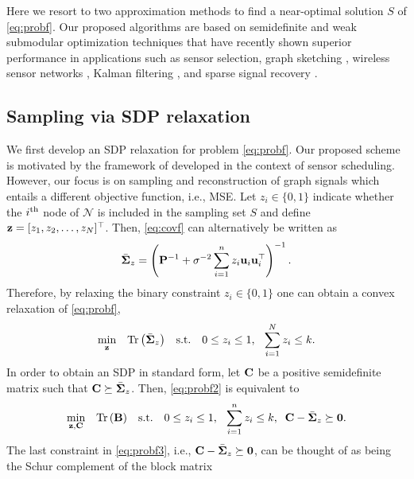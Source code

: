 Here we resort to two approximation methods to find a near-optimal solution $S$ of \ref{eq:probf}. Our proposed algorithms are based on semidefinite and weak submodular optimization techniques that have recently shown superior performance in applications such as sensor selection\cite{joshi2009sensor}, graph sketching \cite{gama2016rethinking}, wireless sensor networks \cite{shamaiah2012greedy}, Kalman filtering \cite{ma}, and sparse signal recovery \cite{das2011submodular,hashemi2016sparse}. 
\vspace{-0.25cm}
\subsection{Sampling via SDP relaxation}
We first develop an SDP relaxation for problem \ref{eq:probf}. Our proposed scheme is motivated by the framework of \cite{joshi2009sensor} developed in the context of sensor scheduling. However, our focus is on sampling and reconstruction of graph signals which entails a different objective function, i.e., MSE.
Let $z_i \in \{0,1\}$ indicate whether the $i\textsuperscript{th}$ node of $\mathcal{N}$ is included in the sampling set $S$ and define ${\mathbf z} = [z_1,z_2,\dots,z_N]^\top$. Then, \ref{eq:covf} can alternatively be written as
%
\begin{equation}
\bar{{\mathbf \Sigma}}_z = \left({\mathbf P}^{-1}+\sigma^{-2}\sum_{i=1}^n z_i{\mathbf u}_i{\mathbf u}_i^\top\right)^{-1}.
\end{equation}
%
Therefore, by relaxing the binary constraint $z_i \in \{0,1\}$ one can obtain a convex relaxation of  \ref{eq:probf},
%
\begin{equation}\label{eq:probf2}
\begin{aligned}
& \underset{{\mathbf z}}{\text{min}}
\quad \mathrm{Tr}\left(\bar{{\mathbf \Sigma}}_z\right)
& \text{s.t.}\quad 0\leq z_i \leq 1, \phantom{k} \sum_{i=1}^Nz_i \leq k.
\end{aligned}
\end{equation}
%
In order to obtain an SDP in standard form, let ${\mathbf C}$ be a positive semidefinite matrix such that ${\mathbf C} \succeq \bar{{\mathbf \Sigma}}_z$. 
Then, \ref{eq:probf2} is equivalent to 
%
\begin{equation}\label{eq:probf3}
\begin{aligned}
& \underset{{\mathbf z},{\mathbf C}}{\text{min}}
\quad \mathrm{Tr}\left({\mathbf B}\right)
& \text{s.t.}\quad 0\leq z_i \leq 1, \phantom{k} \sum_{i=1}^nz_i \leq k, \phantom{k} {\mathbf C} -\bar{{\mathbf \Sigma}}_z \succeq \mathbf{0}.
\end{aligned}
\end{equation}
%
The last constraint in \ref{eq:probf3}, i.e., ${\mathbf C} -\bar{{\mathbf \Sigma}}_z \succeq \mathbf{0}$, can be thought of as being the Schur complement \cite{horn2012matrix} of the block matrix
